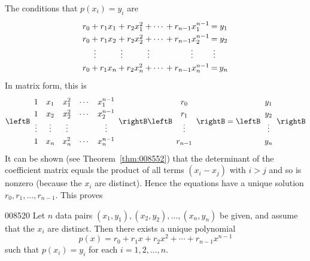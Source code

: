 The conditions that $p(x_{i}) = y_{i}$ are
\begin{equation*}
\arraycolsep=1pt
\def\arraystretch{1.25}
\begin{array}{ccccccccccc}
r_0 & + & r_1x_1 & + & r_2x_1^2 & + & \cdots & + & r_{n-1}x_1^{n-1} & = &y_1 \\
r_0 & + & r_1x_2 & + & r_2x_2^2 & + & \cdots & + & r_{n-1}x_2^{n-1} & = &y_2 \\
 & \vdots & & \vdots & & \vdots & & & \vdots & \vdots & \\
r_0 & + & r_1x_n & + & r_2x_n^2 & + & \cdots & + & r_{n-1}x_n^{n-1} & = & y_n 
\end{array}
\end{equation*}
In matrix form, this is
\begin{equation}\label{eq:polymatrixform}
\leftB \begin{array}{ccccc}
1 & x_1 & x_1^2 & \cdots & x_1^{n-1}\\
1 & x_2 & x_2^2 & \cdots & x_2^{n-1}\\
\vdots & \vdots & \vdots & & \vdots \\
1 & x_n & x_n^2 & \cdots & x_n^{n-1}
\end{array}\rightB
\leftB \begin{array}{c}
r_0 \\
r_1 \\
\vdots \\
r_{n-1}
\end{array} \rightB
=
\leftB \begin{array}{c}
y_1 \\
y_2 \\
\vdots \\
y_n
\end{array} \rightB
\end{equation}
It can be shown (see Theorem~\ref{thm:008552}) that the determinant of the coefficient matrix equals the product of all terms $(x_{i} - x_{j})$ with $i > j$ and so is nonzero (because the $x_{i}$ are distinct). Hence the equations have a unique solution $r_{0}, r_{1}, \dots, r_{n-1}$. This proves


\begin{theorem}{}{008520}
Let $n$ data pairs $(x_{1}, y_{1}), (x_{2}, y_{2}), \dots, (x_{n}, y_{n})$ be given, and assume that the $x_{i}$ are distinct. Then there exists a unique polynomial
\begin{equation*}
p(x) = r_0 + r_1x + r_2x^2 + \cdots + r_{n-1}x^{n-1}
\end{equation*}
such that $p(x_{i}) = y_{i}$ for each $i = 1, 2, \dots, n$.
\end{theorem}

